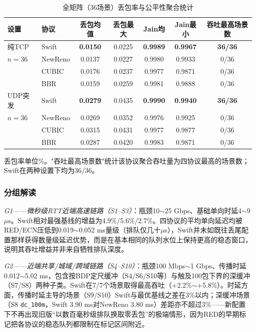\documentclass[10pt,twocolumn]{article}
\begin{document}
\begin{table}[htbp]
\centering
\caption{全矩阵（36场景）丢包率与公平性聚合统计}
\label{tab:agg}
\scriptsize
\setlength{\tabcolsep}{3pt}
\begin{tabular}{@{}llccccc@{}}
\toprule
\textbf{设置} & \textbf{协议} & \textbf{丢包均值} & \textbf{丢包最大} & \textbf{Jain均} & \textbf{Jain最小} & \textbf{吞吐最高场景数} \\
\midrule
纯TCP & Swift    & \textbf{0.0150} & 0.0225 & \textbf{0.9989} & \textbf{0.9967} & \textbf{36/36} \\
$n=36$ & NewReno & 0.0137 & 0.0227 & 0.9980 & 0.9933 & 0/36 \\
      & CUBIC   & 0.0176 & 0.0237 & 0.9977 & 0.9871 & 0/36 \\
      & BBR     & 0.0159 & 0.0259 & 0.9981 & 0.9888 & 0/36 \\
\midrule
UDP突发 & Swift   & \textbf{0.0279} & 0.0435 & \textbf{0.9990} & \textbf{0.9940} & \textbf{36/36} \\
$n=36$ & NewReno & 0.0269 & 0.0352 & 0.9976 & 0.9925 & 0/36 \\
      & CUBIC   & 0.0315 & 0.0431 & 0.9977 & 0.9877 & 0/36 \\
      & BBR     & 0.0287 & 0.0420 & 0.9983 & 0.9871 & 0/36 \\
\bottomrule
\end{tabular}
\vspace{2pt}

\raggedright
\scriptsize 丢包率单位\%。"吞吐最高场景数"统计该协议聚合吞吐量为四协议最高的场景数；Swift在两种设置下均为36/36。
\end{table}

\subsubsection{分组解读}

\textit{G1——微秒级RTT近端高速链路（S1--S3）}：瓶颈10$\sim$25 Gbps、基础单向时延4$\sim$9 $\mu$s。Swift相对最强基线的增益为4.9\%/5.6\%/2.7\%。四协议的平均单向延迟均被RED/ECN压低到0.019$\sim$0.052 ms量级（排队仅几十$\mu$s），Swift并未如既往丢尾配置那样获得数量级延迟优势，而是在基本相同的队列水位上保持更高的稳态窗口，说明其吞吐增益并非来自牺牲排队深度。

\textit{G2——近端共享/城域/跨域链路（S4--S10）}：瓶颈100 Mbps$\sim$1 Gbps、传播时延0.012$\sim$5.02 ms，包含按BDP定尺缓冲（S4/S6/S10等）与触及100包下界的深缓冲（S7/S8）两种子类。Swift在7/7个场景取得最高吞吐（+2.2\%$\sim$+5.8\%）。时延方面，传播时延主导的场景（S9/S10）Swift与最优基线之差在3\%以内；深缓冲场景（S8 \texttt{dc\_100m}，Swift 3.90 ms对NewReno 3.80 ms）差距亦不超过3\%——新配置下不再出现旧版“以数百毫秒级排队换取零丢包”的极端情形，因为RED的早期标记把各协议的稳态队列都限制在标记区间附近。
\end{document}
